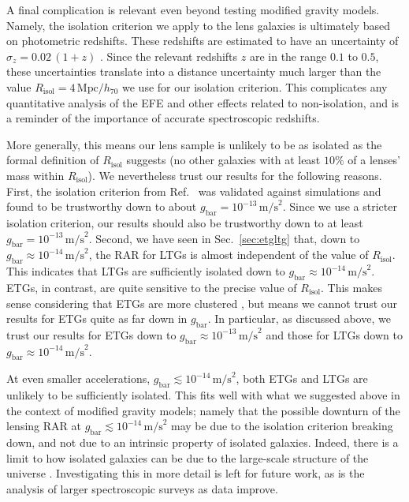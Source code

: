 \documentclass[a4paper,11pt]{article}
\newcommand{\gbar}{\ensuremath{g_{\mathrm{bar}}}}
\begin{document}
A final complication is relevant even beyond testing modified gravity models.
Namely, the isolation criterion we apply to the lens galaxies is ultimately based on photometric redshifts.
These redshifts are estimated to have an uncertainty of $\sigma_z = 0.02 \, (1 + z)$ \citep{Brouwer2021}.
Since the relevant redshifts $z$ are in the range $0.1$ to $0.5$, these uncertainties translate into a distance uncertainty much larger than the value $R_{\mathrm{isol}} = 4\,\mathrm{Mpc}/h_{70}$ we use for our isolation criterion.
This complicates any quantitative analysis of the EFE and other effects related to non-isolation, and is a reminder of the importance of accurate spectroscopic redshifts.

More generally, this means our lens sample is unlikely to be as isolated as the formal definition of $R_{\mathrm{isol}}$ suggests (no other galaxies with at least $10\%$ of a lenses' mass within $R_{\mathrm{isol}}$).
We nevertheless trust our results for the following reasons.
First, the isolation criterion from Ref.~\cite{Brouwer2021} was validated against simulations and found to be trustworthy down to about $\gbar = 10^{-13}\,\mathrm{m/s}^2$.
Since we use a stricter isolation criterion, our results should also be trustworthy down to at least $\gbar = 10^{-13}\,\mathrm{m/s}^2$.
Second, we have seen in Sec.~\ref{sec:etgltg} that, down to $\gbar \approx 10^{-14}\,\mathrm{m/s}^2$, the RAR for LTGs is almost independent of the value of $R_{\mathrm{isol}}$.
This indicates that LTGs are sufficiently isolated down to $g_{\mathrm{bar}} \approx 10^{-14}\,\mathrm{m/s}^2$.
ETGs, in contrast, are quite sensitive to the precise value of $R_{\mathrm{isol}}$.
This makes sense considering that ETGs are more clustered \citep{Dressler1980}, but means we cannot trust our results for ETGs quite as far down in $\gbar$.
In particular, as discussed above, we trust our results for ETGs down to $\gbar \approx 10^{-13}\,\mathrm{m/s}^2$ and those for LTGs down to $\gbar \approx 10^{-14}\,\mathrm{m/s}^2$.

At even smaller accelerations, $\gbar \lesssim 10^{-14}\,\mathrm{m/s}^2$, both ETGs and LTGs are unlikely to be sufficiently isolated.
This fits well with what we suggested above in the context of modified gravity models;
namely that the possible downturn of the lensing RAR at $\gbar \lesssim 10^{-14}\,\mathrm{m/s}^2$ may be due to the isolation criterion breaking down, and not due to an intrinsic property of isolated galaxies.
Indeed, there is a limit to how isolated galaxies can be due to the large-scale structure of the universe \citep{Chae2021b}.
Investigating this in more detail is left for future work, as is the analysis of larger spectroscopic surveys as data improve.
\end{document}
